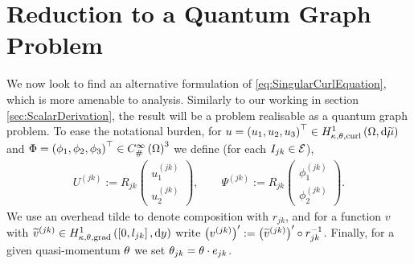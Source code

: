 \section{Reduction to a Quantum Graph Problem} \label{sec:3DSystemDerivation}
We now look to find an alternative formulation of \eqref{eq:SingularCurlEquation}, which is more amenable to analysis.
Similarly to our working in section \ref{sec:ScalarDerivation}, the result will be a problem realisable as a quantum graph problem.
To ease the notational burden, for $u=\left( u_1,u_2,u_3 \right)^\top\in H^1_{\kappa,\theta,\mathrm{curl}}\left( \Omega, \mathrm{d}\widetilde{\mu} \right)$ and $\Phi=\left( \phi_1,\phi_2,\phi_3 \right)^\top\in C^{\infty}_{\#}\left( \Omega \right)^3$ we define (for each $I_{jk}\in\mathcal{E}$),
\begin{align*}
	U^{(jk)} := R_{jk} \begin{pmatrix} u_1^{(jk)} \\ u_2^{(jk)} \end{pmatrix},
	\qquad
	\Psi^{(jk)} := R_{jk} \begin{pmatrix} \phi_1^{(jk)} \\ \phi_2^{(jk)} \end{pmatrix}.
\end{align*}
We use an overhead tilde to denote composition with $r_{jk}$, and for a function $v$ with $\widetilde{v}^{(jk)}\in H^1_{\kappa,\theta,\mathrm{grad}}\left( \left[ 0,l_{jk} \right], \mathrm{d}y \right)$ write $\left( v^{(jk)} \right)' := \left( \widetilde{v}^{(jk)} \right)' \circ r_{jk}^{-1}$.
Finally, for a given quasi-momentum $\theta$ we set $\theta_{jk} = \theta\cdot e_{jk}$.

